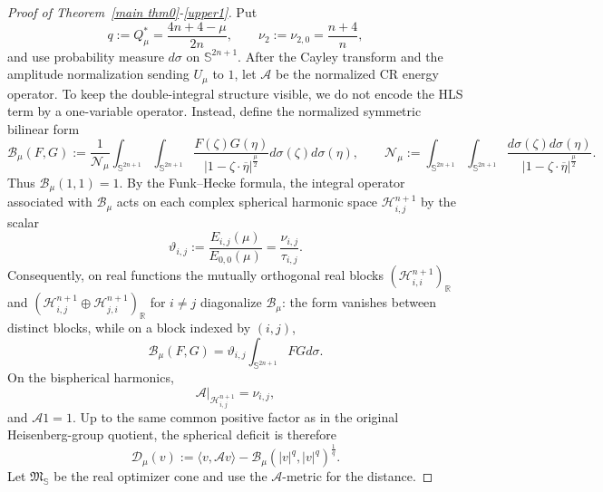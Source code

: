 \documentclass[10pt,a4paper]{amsart}
\begin{document}
\begin{proof}[Proof of Theorem~\ref{main thm0}-\eqref{upper1}]
Put
\[
q:=Q^{\ast}_{\mu}=\frac{4n+4-\mu}{2n},\qquad
\nu_2:=\nu_{2,0}=\frac{n+4}{n},
\]
and use probability measure $d\sigma$ on $\mathbb S^{2n+1}$. After the Cayley transform and the amplitude normalization sending $U_\mu$ to $1$, let $\mathscr A$ be the normalized CR energy operator. {To keep the double-integral structure visible, we do not encode the HLS term by a one-variable operator. Instead, define the normalized symmetric bilinear form
\begin{equation*}
 \mathcal B_\mu(F,G):=\frac{1}{\mathcal N_\mu}
 \int_{\mathbb S^{2n+1}}\int_{\mathbb S^{2n+1}}
 \frac{F(\zeta)G(\eta)}{|1-\zeta\cdot\overline\eta|^{\frac{\mu}{2}}}d\sigma(\zeta)d\sigma(\eta),
 \qquad
 \mathcal N_\mu:=\int_{\mathbb S^{2n+1}}\int_{\mathbb S^{2n+1}}
 \frac{d\sigma(\zeta)d\sigma(\eta)}{|1-\zeta\cdot\overline\eta|^{\frac{\mu}{2}}}.
\end{equation*}
Thus $\mathcal B_\mu(1,1)=1$. By the Funk--Hecke formula, the integral operator associated with $\mathcal B_\mu$ acts on each complex spherical harmonic space $\mathcal H_{i,j}^{n+1}$ by the scalar
\begin{equation*}
 \vartheta_{i,j}:=\frac{E_{i,j}(\mu)}{E_{0,0}(\mu)}=\frac{\nu_{i,j}}{\tau_{i,j}}.
\end{equation*}
Consequently, on real functions the mutually orthogonal real blocks {$(\mathcal H_{i,i}^{n+1})_{\mathbb R}$} and $(\mathcal H_{i,j}^{n+1}\oplus\mathcal H_{j,i}^{n+1})_{\mathbb R}$ for $i\ne j$ diagonalize $\mathcal B_\mu$: the form vanishes between distinct blocks, while on a block indexed by $(i,j)$,
\begin{equation*}
 \mathcal B_\mu(F,G)=\vartheta_{i,j}\int_{\mathbb S^{2n+1}}FGd\sigma.
\end{equation*}}
On the bispherical harmonics,
\begin{equation*}
 \mathscr A|_{\mathcal H_{i,j}^{n+1}}=\nu_{i,j},
\end{equation*}
and $\mathscr A1=1$. {Up to the same common positive factor as in the original Heisenberg-group quotient, the spherical deficit is therefore
\begin{equation*}
 \mathscr D_\mu(v):=\langle v,\mathscr Av\rangle-
 \mathcal B_\mu(|v|^q,|v|^q)^{\frac{1}{q}}.
\end{equation*}}
Let $\mathfrak M_{\mathbb S}$ be the real optimizer cone and use the $\mathscr A$-metric for the distance.


\end{proof}
\end{document}
